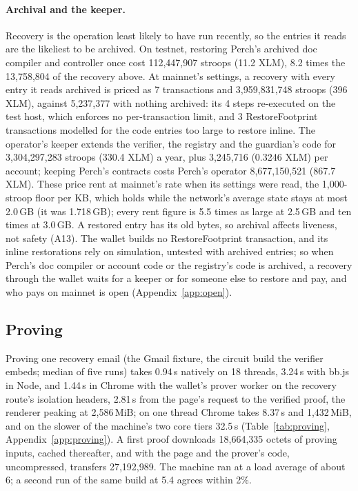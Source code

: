 \paragraph{Archival and the keeper.} Recovery is the operation least likely
to have run recently, so the entries it reads are the likeliest to be
archived. On testnet, restoring Perch's archived doc compiler and controller
once cost 112{,}447{,}907 stroops (11.2 XLM), 8.2 times the
13{,}758{,}804 of the recovery above. At mainnet's settings, a recovery
with every entry it reads archived is priced as 7 transactions and
3{,}959{,}831{,}748 stroops (396 XLM), against 5{,}237{,}377 with nothing
archived: its 4 steps re-executed on the test host, which enforces no
per-transaction limit, and 3 RestoreFootprint transactions modelled for the
code entries too large to restore inline. The operator's keeper extends the
verifier, the registry and the guardian's code for 3{,}304{,}297{,}283
stroops (330.4 XLM) a year, plus 3{,}245{,}716 (0.3246 XLM) per account;
keeping Perch's contracts costs Perch's operator 8{,}677{,}150{,}521 (867.7
XLM). These price rent at mainnet's rate when its settings were read, the
1{,}000-stroop floor per KB, which holds while the network's average state
stays at most 2.0\,GB (it was 1.718\,GB); every rent figure is 5.5 times as
large at 2.5\,GB and ten times at 3.0\,GB. A
restored entry has its old bytes, so archival affects liveness, not safety
(A13). The wallet builds no RestoreFootprint transaction, and its inline
restorations rely on simulation, untested with archived entries; so when
Perch's doc compiler or account code or the registry's code is archived, a
recovery through the wallet waits for a keeper or for someone else to
restore and pay, and who pays on mainnet is open (Appendix~\ref{app:open}).

\subsection{Proving}\label{sec:eval-proving}
Proving one recovery email (the Gmail fixture, the circuit build the
verifier embeds; median of five runs) takes 0.94\,s natively on 18 threads,
3.24\,s with bb.js in Node, and 1.44\,s in Chrome with the wallet's prover
worker on the recovery route's isolation headers, 2.81\,s from the page's
request to the verified proof, the renderer peaking at 2{,}586\,MiB; on one
thread Chrome takes 8.37\,s and 1{,}432\,MiB, and on the slower of the
machine's two core tiers 32.5\,s (Table~\ref{tab:proving},
Appendix~\ref{app:proving}).
A first proof downloads 18{,}664{,}335 octets of proving inputs, cached
thereafter, and with the page and the prover's code, uncompressed, transfers
27{,}192{,}989. The machine ran at a load average of
about 6; a second run of the same build at 5.4 agrees within 2\%.

